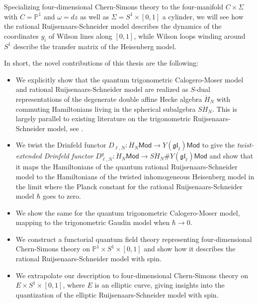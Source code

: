 \documentclass[11pt]{report}
\theoremstyle{definition}
\theoremstyle{remark}
\theoremstyle{remark}
\renewcommand{\P}{\mathbb{P}}
\begin{document}
Specializing four-dimensional Chern-Simons theory to the four-manifold $C \times \Sigma$ with $C = \P^1$ and $\omega = dz$ as well as $\Sigma = S^1 \times [0,1]$ a cylinder, we will see how the rational Ruijsenaars-Schneider model describes the dynamics of the coordinates $y_i$ of Wilson lines along $[0,1]$, while Wilson loops winding around $S^1$ describe the transfer matrix of the Heisenberg model.

In short, the novel contributions of this thesis are the following:
\begin{itemize}
\item We explicitly show that the quantum trigonometric Calogero-Moser model and rational Ruijsenaars-Schneider model are realized as $S$-dual representations of the degenerate double affine Hecke algebra $\ddot H_N$ with commuting Hamiltonians living in the spherical subalgebra $S\ddot H_N$. This is largely parallel to existing literature on the trigonometric Ruijsenaars-Schneider model, see \cite{article:lamers:2022}.
\item We twist the Drinfeld functor $D_{\ell,N}: \dot H_N \mathsf{Mod} \to Y(\mathfrak{gl}_\ell) \mathsf{Mod}$ to give the \emph{twist-extended Drinfeld functor} $D_{\ell,N}^g: \ddot H_N \mathsf{Mod} \to S\ddot H_N \# Y(\mathfrak{gl}_\ell) \mathsf{Mod}$ and show that it maps the Hamiltonians of the quantum rational Ruijsenaars-Schneider model to the Hamiltonians of the twisted inhomogeneous Heisenberg model in the limit where the Planck constant for the rational Ruijsenaars-Schneider model $\hbar$ goes to zero.
\item We show the same for the quantum trigonometric Calogero-Moser model, mapping to the trigonometric Gaudin model when $\hbar \to 0$.
\item We construct a functorial quantum field theory representing four-dimensional Chern-Simons theory on $\P^1 \times S^1 \times [0,1]$ and show how it describes the rational Ruijsenaars-Schneider model with spin.
\item We extrapolate our description to four-dimensional Chern-Simons theory on $E \times S^1 \times [0,1]$, where $E$ is an elliptic curve, giving insights into the quantization of the elliptic Ruijsenaars-Schneider model with spin.
\end{itemize}
\end{document}
